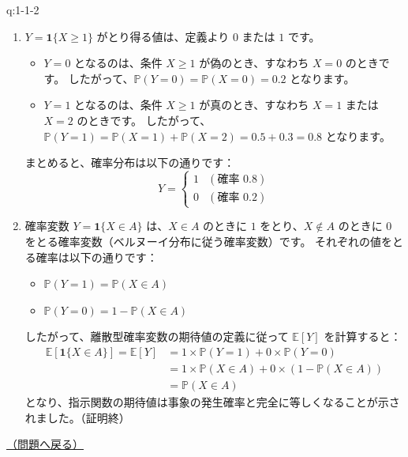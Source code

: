 \begin{answerbox}[phantomlabel=a:1-1-2]{q:1-1-2}

\begin{enumerate}
\def\labelenumi{\arabic{enumi}.}
\item
  \(Y = \boldsymbol{1}\{X \ge 1\}\) がとり得る値は、定義より \(0\)
  または \(1\) です。

  \begin{itemize}
  \tightlist
  \item
    \(Y = 0\) となるのは、条件 \(X \ge 1\) が偽のとき、すなわち
    \(X = 0\) のときです。
    したがって、\(\mathbb{P}(Y = 0) = \mathbb{P}(X = 0) = 0.2\)
    となります。
  \item
    \(Y = 1\) となるのは、条件 \(X \ge 1\) が真のとき、すなわち
    \(X = 1\) または \(X = 2\) のときです。
    したがって、\(\mathbb{P}(Y = 1) = \mathbb{P}(X = 1) + \mathbb{P}(X = 2) = 0.5 + 0.3 = 0.8\)
    となります。
  \end{itemize}

  まとめると、確率分布は以下の通りです： \[
  Y = \begin{cases}
  1 & (\text{確率 } 0.8) \\
  0 & (\text{確率 } 0.2)
  \end{cases}
  \]
\item
  確率変数 \(Y = \boldsymbol{1}\{X \in A\}\) は、\(X \in A\) のときに
  \(1\) をとり、\(X \notin A\) のときに \(0\)
  をとる確率変数（ベルヌーイ分布に従う確率変数）です。
  それぞれの値をとる確率は以下の通りです：

  \begin{itemize}
  \tightlist
  \item
    \(\mathbb{P}(Y = 1) = \mathbb{P}(X \in A)\)
  \item
    \(\mathbb{P}(Y = 0) = 1 - \mathbb{P}(X \in A)\)
  \end{itemize}

  したがって、離散型確率変数の期待値の定義に従って \(\mathbb{E}[Y]\)
  を計算すると： \begin{align*}
  \mathbb{E}[\boldsymbol{1}\{X \in A\}] = \mathbb{E}[Y] &= 1 \times \mathbb{P}(Y = 1) + 0 \times \mathbb{P}(Y = 0) \\
  &= 1 \times \mathbb{P}(X \in A) + 0 \times (1 - \mathbb{P}(X \in A)) \\
  &= \mathbb{P}(X \in A)
  \end{align*}
  となり、指示関数の期待値は事象の発生確率と完全に等しくなることが示されました。（証明終）
\end{enumerate}

\hfill 

\hyperref[q:1-1-2]{（問題へ戻る）}

\end{answerbox}

